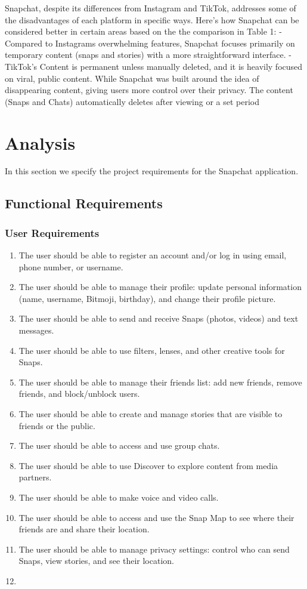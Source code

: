 \documentclass{article}
\begin{document}
Snapchat, despite its differences from Instagram and TikTok, addresses some of the disadvantages of each platform in specific ways. Here's how Snapchat can be considered better in certain areas based on the the comparison in Table 1: \newline
-	Compared to Instagrams overwhelming features, Snapchat focuses primarily on temporary content (snaps and stories) with a more straightforward interface. \newline
-	TikTok's Content is permanent unless manually deleted, and it is heavily focused on viral, public content. While Snapchat was built around the idea of disappearing content, giving users more control over their privacy. The content (Snaps and Chats) automatically deletes after viewing or a set period


\newpage
\section{Analysis}

In this section we specify the project requirements for the Snapchat application.
\subsection{Functional Requirements}
\subsubsection{User Requirements}
\begin{enumerate}
    \item The user should be able to register an account and/or log in using email, phone number, or username.
    \item The user should be able to manage their profile: update personal information (name, username, Bitmoji, birthday), and change their profile picture.
    \item The user should be able to send and receive Snaps (photos, videos) and text messages.
    \item The user should be able to use filters, lenses, and other creative tools for Snaps.
    \item The user should be able to manage their friends list: add new friends, remove friends, and block/unblock users.
    \item The user should be able to create and manage stories that are visible to friends or the public.
    \item The user should be able to access and use group chats.
    \item The user should be able to use Discover to explore content from media partners.
    \item The user should be able to make voice and video calls.
    \item The user should be able to access and use the Snap Map to see where their friends are and share their location.
    \item The user should be able to manage privacy settings: control who can send Snaps, view stories, and see their location.
    \item 
\end{enumerate}
\end{document}
